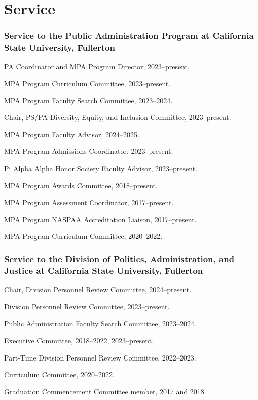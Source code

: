 \documentclass[12pt,letterpaper]{article}
\renewenvironment{itemize}{
  \begin{list}{}{
    \setlength{\leftmargin}{1.5em}
    \setlength{\itemsep}{0.25em}
    \setlength{\parskip}{0pt}
    \setlength{\parsep}{0.25em}
  }
}{
  \end{list}
}
\begin{document}
\section*{Service}

\subsubsection*{Service to the Public Administration Program at California State University, Fullerton}
\begin{itemize}\leftmargin=2pt\itemindent=-15pt
  \item PA Coordinator and MPA Program Director, 2023--present.
  \item MPA Program Curriculum Committee, 2023--present.
  \item MPA Program Faculty Search Committee, 2023--2024.
  \item Chair, PS/PA Diversity, Equity, and Inclusion Committee, 2023--present.
  \item MPA Program Faculty Advisor, 2024--2025.
  \item MPA Program Admissions Coordinator, 2023--present.
  \item Pi Alpha Alpha Honor Society Faculty Advisor, 2023--present.
  \item MPA Program Awards Committee, 2018--present.
  \item MPA Program Assessment Coordinator, 2017--present.
  \item MPA Program NASPAA Accreditation Liaison, 2017--present.
  \item MPA Program Curriculum Committee, 2020--2022.
\end{itemize}
\subsubsection*{Service to the Division of Politics, Administration, and Justice at California State University, Fullerton}
\begin{itemize}\leftmargin=2pt\itemindent=-15pt
  \item Chair, Division Personnel Review Committee, 2024--present.
  \item Division Personnel Review Committee, 2023--present.
  \item Public Administration Faculty Search Committee, 2023--2024.
  \item Executive Committee, 2018--2022, 2023--present.
  \item Part-Time Division Personnel Review Committee, 2022--2023.
  \item Curriculum Committee, 2020--2022.
  \item Graduation Commencement Committee member, 2017 and 2018.
\end{itemize}
\end{document}
